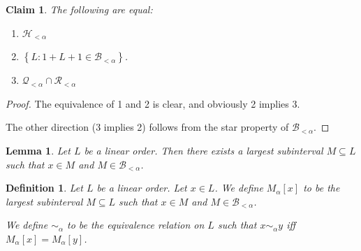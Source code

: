 \documentclass{article}
\newtheorem{lemma}{Lemma}
\newtheorem{claim}{Claim}
\newtheorem{definition}{Definition}
\newcommand{\braces}[1]{\left\{ {#1} \right\}}
\newcommand{\setcomp}[1]{\braces{#1}}
\begin{document}
\begin{claim}
  The following are equal:
  
  \begin{enumerate}
    \item $\mathcal{H}_{< \alpha}$
    \item $\setcomp{L : 1 + L + 1 \in \mathcal{B}_{< \alpha}}$.
    \item $\mathcal{Q}_{< \alpha} \cap \mathcal{R}_{< \alpha}$
  \end{enumerate}
  
\end{claim}

\begin{proof}
  The equivalence of 1 and 2 is clear, and obviously 
  2 implies 3.

  The other direction (3 implies 2) follows from the star property
  of $\mathcal{B}_{< \alpha}$.
\end{proof}

\begin{lemma}
  Let $L$ be a linear order. Then there exists a largest subinterval $M \subseteq L$ such that
  $x \in M$ and $M \in \mathcal{B}_{< \alpha}$.
\end{lemma}

\begin{definition}
  Let $L$ be a linear order. Let $x \in L$. We define $M_{\alpha}[x]$ to be the largest subinterval
  $M \subseteq L$ such that $x \in M$ and $M \in \mathcal{B}_{< \alpha}$.

  We define $\sim_{\alpha}$ to be the equivalence relation on $L$ such that $x \sim_{\alpha} y$ iff
  $M_{\alpha}[x] = M_{\alpha}[y]$.
\end{definition}
\end{document}
